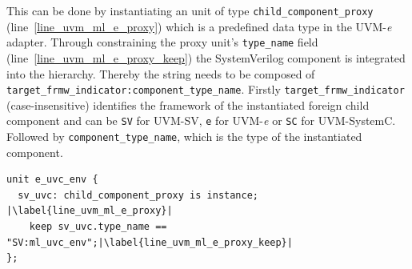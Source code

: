 This can be done by instantiating an unit of type
\lstinline$child_component_proxy$ (line~\ref{line_uvm_ml_e_proxy}) which is a
predefined data type in the UVM-\textit{e} adapter.
Through constraining the proxy unit's \lstinline$type_name$ field
(line~\ref{line_uvm_ml_e_proxy_keep}) the
SystemVerilog component is integrated into the hierarchy. Thereby the string
needs to be composed of \lstinline$target_frmw_indicator:component_type_name$. Firstly
\lstinline$target_frmw_indicator$ (case-insensitive) identifies the framework
of the instantiated foreign child component and can be \lstinline$SV$ for
UVM-SV, \lstinline$e$ for UVM-\textit{e} or \lstinline$SC$ for UVM-SystemC. Followed by
\lstinline$component_type_name$, which is the type of the instantiated component.
\medskip
\lstset{language=e, numbers=left, escapechar=|}
\begin{lstlisting}[frame=htrbl, caption={\textit{e}: instantiating the UVM-SV component in the UVM-\textit{e} unit},
label={lst:e_unified_top}]
unit e_uvc_env {
  sv_uvc: child_component_proxy is instance;	|\label{line_uvm_ml_e_proxy}|
    keep sv_uvc.type_name == "SV:ml_uvc_env";|\label{line_uvm_ml_e_proxy_keep}| 
};
\end{lstlisting}


